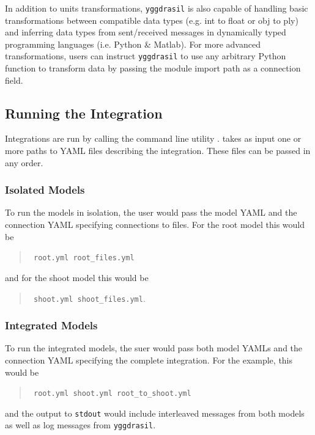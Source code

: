 \documentclass[journal]{IEEEtran}
\newcommand{\todo}[1]{{\color{red}{#1}}}
\newcommand{\pkg}{{\tt yggdrasil}{}}
\newcommand{\pkgrun}{{\tt \todo{cisrun}}}
\begin{document}
In addition to units transformations, {\pkg} is also capable of handling basic transformations between compatible data types (e.g. int to float or obj to ply) and inferring data types from sent/received messages in dynamically typed programming languages (i.e. Python \& Matlab). For more advanced transformations, users can instruct {\pkg} to use any arbitrary Python function to transform data by passing the module import path as a connection field.

\subsection{Running the Integration}
%
Integrations are run by calling the command line utility {\pkgrun}. {\pkgrun} takes as input one or more paths to YAML files describing the integration. These files can be passed in any order.

\subsubsection{Isolated Models}
%
To run the models in isolation, the user would pass {\pkgrun} the model YAML and the connection YAML specifying connections to files. For the root model this would be 
%
\begin{quote}
{\tt {\pkgrun} root.yml root\_files.yml} 
\end{quote}
%
and for the shoot model this would be 
%
\begin{quote}
{\tt {\pkgrun} shoot.yml shoot\_files.yml}. 
\end{quote}

\subsubsection{Integrated Models}
%
To run the integrated models, the suer would pass {\pkgrun} both model YAMLs and the connection YAML specifying the complete integration. For the example, this would be 
\begin{quote}
{\tt {\pkgrun} root.yml shoot.yml root\_to\_shoot.yml}
\end{quote}
and the output to {\tt stdout} would include interleaved messages from both models as well as log messages from {\pkg}.

\end{document}
